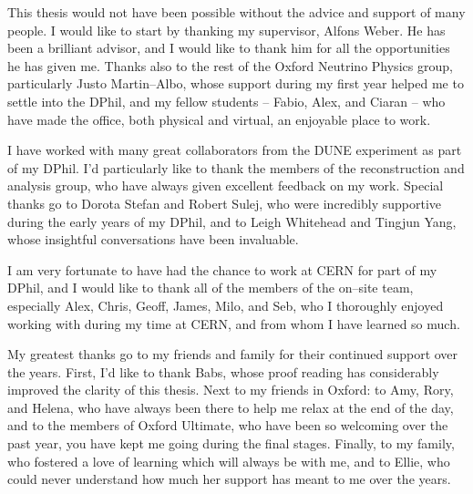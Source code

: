 This thesis would not have been possible without the advice and support of many
people. I would like to start by thanking my supervisor, Alfons Weber. He has
been a brilliant advisor, and I would like to thank him for all the 
opportunities he has given me. Thanks also to the rest of the Oxford Neutrino 
Physics group, particularly Justo Martin--Albo, whose support during my first 
year helped me to settle into the DPhil, and my fellow students -- Fabio, Alex, 
and Ciaran -- who have made the office, both physical and virtual, an enjoyable 
place to work.

\medskip\noindent
I have worked with many great collaborators from the DUNE experiment
as part of my DPhil. I'd particularly like to thank the members of the 
\protodune{} reconstruction and analysis group, who have always given 
excellent feedback on my work. Special thanks go to Dorota Stefan and Robert 
Sulej, who were incredibly supportive during the early years of my DPhil, and 
to Leigh Whitehead and Tingjun Yang, whose insightful conversations have been 
invaluable. 

\medskip\noindent
I am very fortunate to have had the chance to work at CERN for part of my DPhil,
and I would like to thank all of the members of the on--site \protodune{} 
team, especially Alex, Chris, Geoff, James, Milo, and Seb, who I thoroughly 
enjoyed working with during my time at CERN, and from whom I have learned so 
much. 

\medskip\noindent
My greatest thanks go to my friends and family for their continued support 
over the years. First, I'd like to thank Babs, whose proof reading has
considerably improved the clarity of this thesis. Next to my friends in 
Oxford: to Amy, Rory, and Helena, who have always been there to help me relax 
at the end of the day, and to the members of Oxford Ultimate, who have been so 
welcoming over the past year, you have kept me going during the final stages. 
Finally, to my family, who fostered a love of learning which will always be 
with me, and to Ellie, who could never understand how much her support has 
meant to me over the years.
